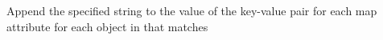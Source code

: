 Append the specified string to the value of the key-value pair for each map
attribute for each object in  that matches 



